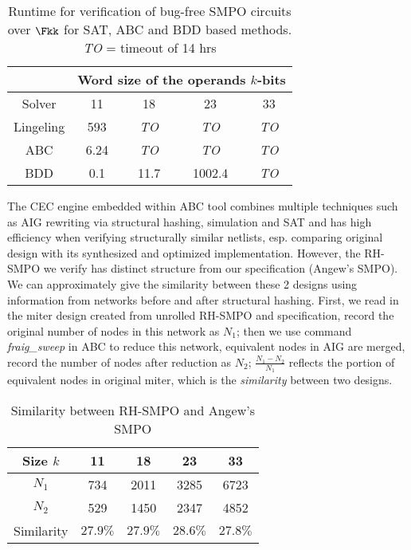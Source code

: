 \begin{table}[tb]
\centering
\caption{Runtime for verification of bug-free SMPO circuits over $\Fkk$ for SAT, ABC and BDD based methods. \emph{TO} = timeout of 14 hrs}
\begin{tabular}{|c||c|c|c|c|} 
\hline
& \multicolumn{4}{|c|}{Word size of the operands $k$-bits}  \\
\hline
Solver & 11 & 18 & 23 & 33 \\
\hline
\hline
Lingeling & 593  & \emph{TO}  & \emph{TO}  & \emph{TO}\\
\hline
\hline
ABC & 6.24 & \emph{TO} & \emph{TO} & \emph{TO}\\
\hline
\hline
BDD & 0.1 & 11.7 & 1002.4 & \emph{TO}  \\
\hline
\end{tabular}
\label{table:satbdd}  
\end{table} 

The CEC engine embedded within ABC tool \cite{brayton2010abc} combines multiple techniques such as AIG rewriting via structural hashing, simulation and
SAT and has high efficiency when verifying structurally similar netlists, esp. comparing original design with its synthesized and optimized implementation.
However, the RH-SMPO we verify has distinct structure from our specification (Angew's SMPO). We can approximately give the similarity between these 2 designs
using information from networks before and after structural hashing. First, we read in the miter design created from unrolled RH-SMPO and specification,
record the original number of nodes in this network as $N_1$; then we use command \emph{fraig\_sweep} in ABC to reduce this network, equivalent nodes in AIG
are merged, record the number of nodes after reduction as $N_2$; $\frac{N_1-N_2}{N_1}$ reflects the portion of equivalent nodes in original miter, which is
the \emph{similarity} between two designs.

\begin{table}[tb]
\centering
\caption{Similarity between RH-SMPO and Angew's SMPO}
\begin{tabular}{|c||c|c|c|c|} 
\hline
Size $k$ & 11 & 18 & 23 & 33 \\
\hline
$N_1$ & 734  & 2011  & 3285  & 6723\\
\hline
$N_2$ & 529 & 1450 & 2347 & 4852\\
\hline
Similarity & $27.9\%$ & $27.9\%$ & $28.6\%$ & $27.8\%$  \\
\hline
\end{tabular}\label{table:similarity}  
\end{table} 

